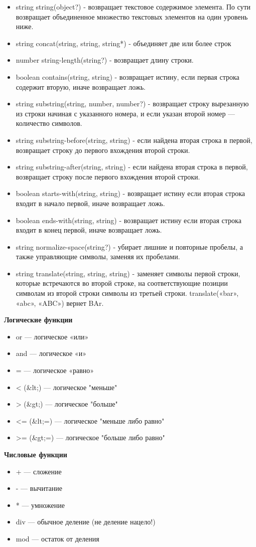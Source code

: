 \documentclass[12pt,a4paper,oneside]{article} %
\begin{document}
\begin{itemize}
\item string string(object?) - возвращает текстовое содержимое элемента. По сути возвращает объединенное множество текстовых элементов на один уровень ниже.
\item string concat(string, string, string*) - объединяет две или более строк
\item number string-length(string?) - возвращает длину строки.
\item boolean contains(string, string) - возвращает истину, если первая строка содержит вторую, иначе возвращает ложь.
\item string substring(string, number, number?) - возвращает строку вырезанную из строки начиная с указанного номера, и если указан второй номер — количество символов.
\item string substring-before(string, string) - если найдена вторая строка в первой, возвращает строку до первого вхождения второй строки.
\item string substring-after(string, string) - если найдена вторая строка в первой, возвращает строку после первого вхождения второй строки.
\item boolean starts-with(string, string) - возвращает истину если вторая строка входит в начало первой, иначе возвращает ложь.
\item boolean ends-with(string, string) - возвращает истину если вторая строка входит в конец первой, иначе возвращает ложь.
\item string normalize-space(string?) - убирает лишние и повторные пробелы, а также управляющие символы, заменяя их пробелами.
\item string translate(string, string, string) - заменяет символы первой строки, которые встречаются во второй строке, на соответствующие позиции символам из второй строки символы из третьей строки. translate(«bar», «abc», «ABC») вернет BAr.
\end{itemize}

\textbf{Логические функции}

\begin{itemize}
\item or — логическое «или»
\item and — логическое «и»
\item = — логическое «равно»
\item < (\&lt;) — логическое "меньше"
\item > (\&gt;) — логическое "больше"
\item <= (\&lt;=) — логическое "меньше либо равно"
\item >= (\&gt;=) — логическое "больше либо равно"
\end{itemize}

\textbf{Числовые функции}

\begin{itemize}
\item + — сложение
\item - — вычитание
\item * — умножение
\item div — обычное деление (не деление нацело!)
\item mod — остаток от деления
\end{itemize}

\end{document}
